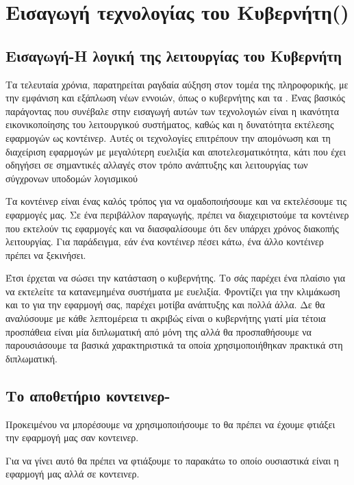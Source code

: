 \chapter{Εισαγωγή τεχνολογίας του Κυβερνήτη()}

\section{Εισαγωγή-Η λογική της λειτουργίας του Κυβερνήτη}

Τα τελευταία χρόνια, παρατηρείται ραγδαία αύξηση στον τομέα της πληροφορικής, 
με την εμφάνιση και εξάπλωση νέων εννοιών, όπως ο κυβερνήτης και τα . 
Ένας βασικός παράγοντας που συνέβαλε στην εισαγωγή αυτών των τεχνολογιών είναι η ικανότητα εικονικοποίησης 
του λειτουργικού συστήματος, καθώς και η δυνατότητα εκτέλεσης εφαρμογών ως κοντέινερ. 
Αυτές οι τεχνολογίες επιτρέπουν την απομόνωση και τη διαχείριση εφαρμογών με μεγαλύτερη ευελιξία και 
αποτελεσματικότητα, κάτι που έχει οδηγήσει σε σημαντικές αλλαγές στον τρόπο ανάπτυξης και λειτουργίας των σύγχρονων υποδομών λογισμικού

Τα κοντέινερ είναι ένας καλός τρόπος για να ομαδοποιήσουμε και να εκτελέσουμε τις εφαρμογές μας. 
Σε ένα περιβάλλον παραγωγής, πρέπει να διαχειριστούμε τα κοντέινερ που εκτελούν τις εφαρμογές και να 
διασφαλίσουμε ότι δεν υπάρχει χρόνος διακοπής λειτουργίας. Για παράδειγμα, εάν ένα κοντέινερ πέσει κάτω, ένα άλλο κοντέινερ πρέπει να ξεκινήσει. 

Έτσι έρχεται να σώσει την κατάσταση ο κυβερνήτης. Το  σάς παρέχει ένα πλαίσιο για να εκτελείτε τα κατανεμημένα συστήματα με ευελιξία. 
Φροντίζει για την κλιμάκωση και το  για την εφαρμογή σας, παρέχει μοτίβα ανάπτυξης και πολλά άλλα. Δε θα αναλύσουμε με κάθε λεπτομέρεια
τι ακριβώς είναι ο κυβερνήτης γιατί μία τέτοια προσπάθεια είναι μία διπλωματική από μόνη της αλλά θα προσπαθήσουμε να παρουσιάσουμε τα βασικά χαρακτηριστικά τα οποία
χρησιμοποιήθηκαν πρακτικά στη διπλωματική.

\section{Το αποθετήριο κοντεινερ-}

Προκειμένου να μπορέσουμε να χρησιμοποιήσουμε το  θα πρέπει να έχουμε φτιάξει την εφαρμογή μας σαν κοντεινερ.

Για να γίνει αυτό θα πρέπει να φτιάξουμε το παρακάτω  το οποίο ουσιαστικά είναι η εφαρμογή μας αλλά σε κοντεινερ.


